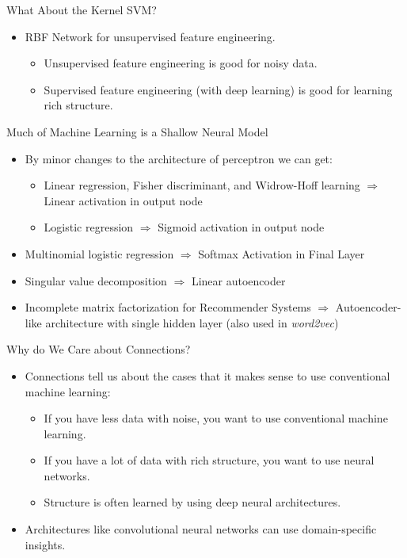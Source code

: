 \begin{frame}{What About the Kernel SVM?}
\begin{itemize}
\item RBF Network for unsupervised feature engineering.
\begin{itemize}
\item Unsupervised feature engineering is good for noisy data.
\item Supervised feature engineering (with deep learning) is good
for learning rich structure. \end{itemize}
\end{itemize}
\end{frame}


\begin{frame}{Much of Machine Learning is a Shallow Neural Model}
\begin{itemize}
\item  By minor changes to the architecture of  perceptron we can get:
\begin{itemize}
\item Linear regression, Fisher discriminant, and Widrow-Hoff learning $\Rightarrow$ Linear activation in output
node
\item Logistic regression $\Rightarrow$ Sigmoid activation in output
node
\end{itemize}
\item Multinomial logistic regression $\Rightarrow$ Softmax
Activation in Final Layer
\item Singular value decomposition $\Rightarrow$ Linear autoencoder
\item Incomplete matrix factorization for Recommender Systems  $\Rightarrow$ Autoencoder-like architecture  with
single hidden layer (also used in {\em word2vec})
\end{itemize}
\end{frame}


\begin{frame}{Why do We Care about Connections?}
\begin{itemize}
\item Connections tell us about the cases that it makes sense to use
conventional machine learning:
\begin{itemize}
\item If you have less data with noise, you want to use conventional
machine learning.
\item If you have a lot of data with rich structure, you want to use
neural networks.
\item Structure is often learned by using deep neural
architectures.
\end{itemize}
\item Architectures like convolutional neural networks can use
domain-specific insights.
\end{itemize}
\end{frame}




